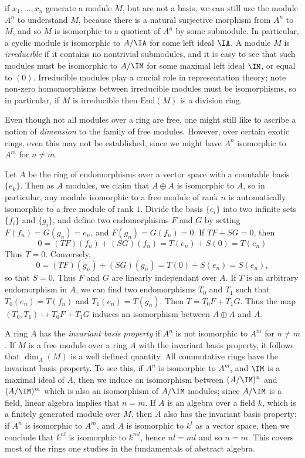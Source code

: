 if $x_1, \dots, x_n$ generate a module $M$, but are not a basis, we can still use the module $A^n$ to understand $M$, because there is a natural surjective morphism from $A^n$ to $M$, and so $M$ is isomorphic to a quotient of $A^n$ by some submodule. In particular, a cyclic module is isomorphic to $A/\IA$ for some left ideal $\IA$. A module $M$ is \emph{irreducible} if it contains no nontrivial submodules, and it is easy to see that such modules must be isomorphic to $A/\IM$ for some maximal left ideal $\IM$, or equal to $(0)$. Irreducible modules play a crucial role in representation theory; note non-zero homomorphisms between irreducible modules must be isomorphisms, so in particular, if $M$ is irreducible then $\text{End}(M)$ is a division ring.

Even though not all modules over a ring are free, one might still like to ascribe a notion of \emph{dimension} to the family of free modules. However, over certain exotic rings, even this may not be established, since we might have $A^n$ isomorphic to $A^m$ for $n \neq m$.

\begin{example}
    Let $A$ be the ring of endomorphisms over a vector space with a countable basis $\{ e_k \}$. Then as $A$ modules, we claim that $A \oplus A$ is isomorphic to $A$, so in particular, any module isomorphic to a free module of rank $n$ is automatically isomorphic to a free module of rank $1$. Divide the basis $\{ e_i \}$ into two infinite sets $\{ f_i \}$ and $\{ g_i \}$, and define two endomorphisms $F$ and $G$ by setting $F(f_n) = G(g_n) = e_n$, and $F(g_n) = G(f_n) = 0$. If $TF + SG = 0$, then
    \[ 0 = (TF)(f_n) + (SG)(f_n) = T(e_n) + S(0) = T(e_n) \]
    Thus $T = 0$. Conversely,
    \[ 0 = (TF)(g_n) + (SG)(g_n) = T(0) + S(e_n) = S(e_n), \]
    so that $S = 0$. Thus $F$ and $G$ are linearly independant over $A$. If $T$ is an arbitrary endomorphism in $A$, we can find two endomorphisms $T_0$ and $T_1$ such that $T_0(e_n) = T(f_n)$ and $T_1(e_n) = T(g_n)$. Then $T = T_0 F + T_1 G$. Thus the map $(T_0,T_1) \mapsto T_0 F + T_1 G$ induces an isomorphism between $A \oplus A$ and $A$.
\end{example}

A ring $A$ has the \emph{invariant basis property} if $A^n$ is not isomorphic to $A^m$ for $n \neq m$. If $M$ is a free module over a ring $A$ with the invariant basis property, it follows that $\dim_A(M)$ is a well defined quantity. All commutative rings have the invariant basis property. To see this, if $A^n$ is isomorphic to $A^m$, and $\IM$ is a maximal ideal of $A$, then we induce an isomorphism between $(A/\IM)^n$ and $(A/\IM)^m$ which is also an isomorphism of $A/\IM$ modules; since $A/\IM$ is a field, linear algebra implies that $n = m$. If $A$ is an algebra over a field $k$, which is a finitely generated module over $M$, then $A$ also has the invariant basis property; if $A^n$ is isomorphic to $A^m$, and $A$ is isomorphic to $k^l$ as a vector space, then we conclude that $k^{nl}$ is isomorphic to $k^{ml}$, hence $nl = ml$ and so $n = m$. This covers most of the rings one studies in the fundamentals of abstract algebra.

